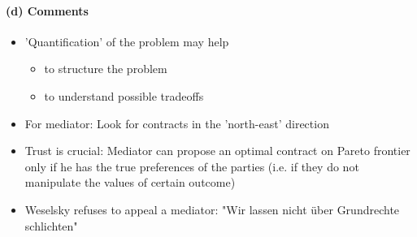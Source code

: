 \paragraph{(d) Comments}
\begin{itemize}
    \item 'Quantification' of the problem may help
        \begin{itemize}
            \item to structure the problem
            \item to understand possible tradeoffs
        \end{itemize}
    \item For mediator: Look for contracts in the 'north-east' direction
    \item Trust is crucial: Mediator can propose an optimal contract on Pareto
        frontier only if he has the true preferences of the parties (i.e.
        if they do not manipulate the values of certain outcome)
    \item Weselsky refuses to appeal a mediator: "Wir lassen nicht über
        Grundrechte schlichten"
\end{itemize}

